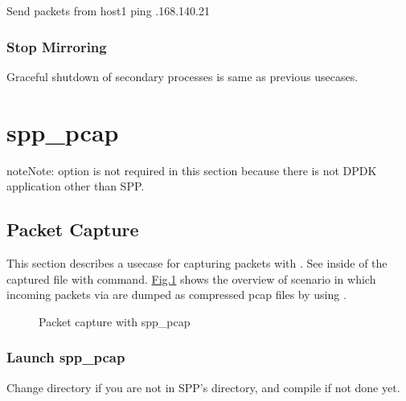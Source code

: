 \documentclass[a4paper,11pt,openany,oneside,english]{sphinxmanual}
\begin{document}
\begin{sphinxVerbatim}[commandchars=\\\{\},formatcom=\footnotesize]
 Send packets from host1
 ping .168.140.21
\end{sphinxVerbatim}


\subsubsection{Stop Mirroring}
\label{\detokenize{usecases/spp_mirror:id3}}
Graceful shutdown of secondary processes is same as previous usecases.


\section{spp\_pcap}
\label{\detokenize{usecases/spp_pcap:spp-pcap}}\label{\detokenize{usecases/spp_pcap:spp-usecases-pcap}}\label{\detokenize{usecases/spp_pcap::doc}}
\begin{sphinxadmonition}{note}{Note:}
 option is not required in this section because there is
not DPDK application other than SPP.
\end{sphinxadmonition}


\subsection{Packet Capture}
\label{\detokenize{usecases/spp_pcap:packet-capture}}
This section describes a usecase for capturing packets with .
See inside of the captured file with  command.
\hyperref[\detokenize{usecases/spp_pcap:figure-simple-capture}]{Fig.\@ \ref{\detokenize{usecases/spp_pcap:figure-simple-capture}}} shows the overview of scenario in which
incoming packets via  are dumped as compressed pcap files by using
.

\begin{figure}[htbp]
\centering
\capstart

\noindent{}
\caption{Packet capture with spp\_pcap}\label{\detokenize{usecases/spp_pcap:id1}}\label{\detokenize{usecases/spp_pcap:figure-simple-capture}}\end{figure}


\subsubsection{Launch spp\_pcap}
\label{\detokenize{usecases/spp_pcap:launch-spp-pcap}}\label{\detokenize{usecases/spp_pcap:spp-pcap-use-case-launch-pcap}}
Change directory if you are not in SPP’s directory,
and compile if not done yet.
\end{document}
